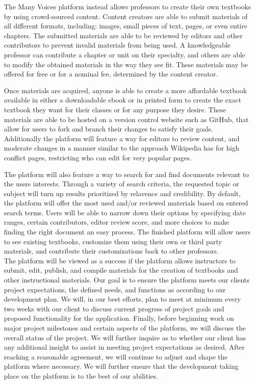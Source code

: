 \documentclass[letterpaper, 10pt, draftclsnofoot, onecolumn]{IEEEtran}
\begin{document}
 The Many Voices platform instead allows professors to create their own textbooks 
by using crowd-sourced content. Content creators are able to submit materials of 
all different formats, including: images, small pieces of text, pages, or even entire chapters. 
The submitted materials are able to be reviewed by editors and other contributors to prevent invalid 
materials from being used.
A knowledgeable professor can contribute a chapter or unit on their specialty, and 
others are able to modify the obtained materials in the way they see fit. These materials may be
offered for free or for a nominal fee, determined by the content creator.

Once materials are acquired, anyone is able to create a more affordable textbook available in either
a downloadable ebook or in printed form to create the exact textbook they want for their classes
or for any purpose they desire. These materials are able to be hosted on a version control 
website such as GitHub, that allow for users to fork and branch their changes to satisfy their goals.
Additionally the platform will feature a way for editors to review content, and moderate changes in a manner similar
to the approach Wikipedia has for high conflict pages, restricting who can edit for very popular pages.

The platform will also feature a way to search for and find documents relevant to the users interests. 
Through a variety of search criteria, the requested topic or subject will turn up results prioritized by
relavence and credibility. By default, the platform will offer the most used and/or reviewed materials
based on entered search terms. Users will be able to narrow down their options by specifying date ranges,
certain contributors, editor review score, and more choices to make finding the right document an easy process.
The finished platform will allow users to see existing 
textbooks, customize them using their own or third party materials, and contribute their 
customizations back to other professors. \\

The platform will be viewed as a success if the platform allows instructors to submit, edit, publish, 
and compile materials for the creation of textbooks and other instructional materials. 
Our goal is to ensure the platform meets our clients project expectations, the defined needs,
and functions as according to our development plan. We will, in our best efforts, plan to meet at 
minimum every two weeks with our client to discuss current progress of project goals and 
proposed functionality for the application. 
Finally, before beginning work on major project milestones and certain aspects of the platform, we will 
discuss the overall status of the project. We will further inquire as to whether our client has any additional insight to assist in 
meeting project expectations as desired. After reaching a reasonable agreement, we will continue to adjust 
and shape the platform where necessary. We will further ensure that the development taking place on
the platform is to the best of our abilities. \\
\end{document}
